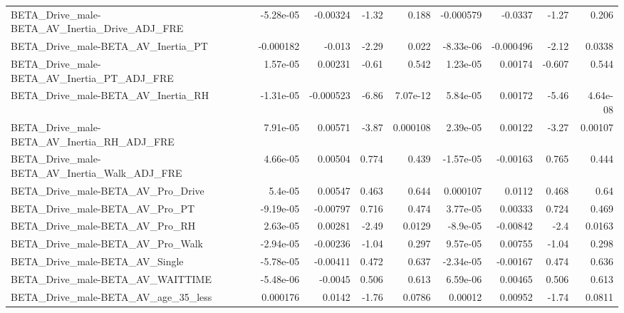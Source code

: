 \begin{tabular}{lrrrrrrrr}
BETA\_Drive\_male-BETA\_AV\_Inertia\_Drive\_ADJ\_FRE      &   -5.28e-05 &     -0.00324 &    -1.32 &    0.188 &  -0.000579 &     -0.0337 &        -1.27 &         0.206 \\
BETA\_Drive\_male-BETA\_AV\_Inertia\_PT                 &   -0.000182 &       -0.013 &    -2.29 &    0.022 &  -8.33e-06 &   -0.000496 &        -2.12 &        0.0338 \\
BETA\_Drive\_male-BETA\_AV\_Inertia\_PT\_ADJ\_FRE         &    1.57e-05 &      0.00231 &    -0.61 &    0.542 &   1.23e-05 &     0.00174 &       -0.607 &         0.544 \\
BETA\_Drive\_male-BETA\_AV\_Inertia\_RH                 &   -1.31e-05 &    -0.000523 &    -6.86 & 7.07e-12 &   5.84e-05 &     0.00172 &        -5.46 &      4.64e-08 \\
BETA\_Drive\_male-BETA\_AV\_Inertia\_RH\_ADJ\_FRE         &    7.91e-05 &      0.00571 &    -3.87 & 0.000108 &   2.39e-05 &     0.00122 &        -3.27 &       0.00107 \\
BETA\_Drive\_male-BETA\_AV\_Inertia\_Walk\_ADJ\_FRE       &    4.66e-05 &      0.00504 &    0.774 &    0.439 &  -1.57e-05 &    -0.00163 &        0.765 &         0.444 \\
BETA\_Drive\_male-BETA\_AV\_Pro\_Drive                  &     5.4e-05 &      0.00547 &    0.463 &    0.644 &   0.000107 &      0.0112 &        0.468 &          0.64 \\
BETA\_Drive\_male-BETA\_AV\_Pro\_PT                     &   -9.19e-05 &     -0.00797 &    0.716 &    0.474 &   3.77e-05 &     0.00333 &        0.724 &         0.469 \\
BETA\_Drive\_male-BETA\_AV\_Pro\_RH                     &    2.63e-05 &      0.00281 &    -2.49 &   0.0129 &   -8.9e-05 &    -0.00842 &         -2.4 &        0.0163 \\
BETA\_Drive\_male-BETA\_AV\_Pro\_Walk                   &   -2.94e-05 &     -0.00236 &    -1.04 &    0.297 &   9.57e-05 &     0.00755 &        -1.04 &         0.298 \\
BETA\_Drive\_male-BETA\_AV\_Single                     &   -5.78e-05 &     -0.00411 &    0.472 &    0.637 &  -2.34e-05 &    -0.00167 &        0.474 &         0.636 \\
BETA\_Drive\_male-BETA\_AV\_WAITTIME                   &   -5.48e-06 &      -0.0045 &    0.506 &    0.613 &   6.59e-06 &     0.00465 &        0.506 &         0.613 \\
BETA\_Drive\_male-BETA\_AV\_age\_35\_less                &    0.000176 &       0.0142 &    -1.76 &   0.0786 &    0.00012 &     0.00952 &        -1.74 &        0.0811 \\

\end{tabular}
